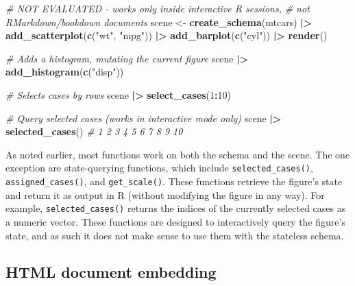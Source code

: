 \documentclass[
]{book}
\newenvironment{Shaded}{\begin{snugshade}}{\end{snugshade}}
\newcommand{\CommentTok}[1]{\textcolor[rgb]{0.56,0.35,0.01}{\textit{#1}}}
\newcommand{\DecValTok}[1]{\textcolor[rgb]{0.00,0.00,0.81}{#1}}
\newcommand{\FunctionTok}[1]{\textcolor[rgb]{0.13,0.29,0.53}{\textbf{#1}}}
\newcommand{\NormalTok}[1]{#1}
\newcommand{\OtherTok}[1]{\textcolor[rgb]{0.56,0.35,0.01}{#1}}
\newcommand{\SpecialCharTok}[1]{\textcolor[rgb]{0.81,0.36,0.00}{\textbf{#1}}}
\newcommand{\StringTok}[1]{\textcolor[rgb]{0.31,0.60,0.02}{#1}}
\theoremstyle{definition}
\theoremstyle{definition}
\theoremstyle{definition}
\theoremstyle{definition}
\theoremstyle{remark}
\begin{document}
\begin{Shaded}
\begin{Highlighting}[]
\CommentTok{\# NOT EVALUATED {-} works only inside interactive R sessions,}
\CommentTok{\# not RMarkdown/bookdown documents}
\NormalTok{scene }\OtherTok{\textless{}{-}} \FunctionTok{create\_schema}\NormalTok{(mtcars) }\SpecialCharTok{|\textgreater{}}
  \FunctionTok{add\_scatterplot}\NormalTok{(}\FunctionTok{c}\NormalTok{(}\StringTok{"wt"}\NormalTok{, }\StringTok{"mpg"}\NormalTok{)) }\SpecialCharTok{|\textgreater{}}
  \FunctionTok{add\_barplot}\NormalTok{(}\FunctionTok{c}\NormalTok{(}\StringTok{"cyl"}\NormalTok{)) }\SpecialCharTok{|\textgreater{}}
  \FunctionTok{render}\NormalTok{()}

\CommentTok{\# Adds a histogram, mutating the current figure}
\NormalTok{scene }\SpecialCharTok{|\textgreater{}} \FunctionTok{add\_histogram}\NormalTok{(}\FunctionTok{c}\NormalTok{(}\StringTok{"disp"}\NormalTok{))}

\CommentTok{\# Selects cases by rows}
\NormalTok{scene }\SpecialCharTok{|\textgreater{}} \FunctionTok{select\_cases}\NormalTok{(}\DecValTok{1}\SpecialCharTok{:}\DecValTok{10}\NormalTok{)}

\CommentTok{\# Query selected cases (works in interactive mode only)}
\NormalTok{scene }\SpecialCharTok{|\textgreater{}} \FunctionTok{selected\_cases}\NormalTok{() }\CommentTok{\# 1 2 3 4 5 6 7 8 9 10}
\end{Highlighting}
\end{Shaded}

As noted earlier, most functions work on both the schema and the scene. The one exception are state-querying functions, which include \texttt{selected\_cases()}, \texttt{assigned\_cases()}, and \texttt{get\_scale()}. These functions retrieve the figure's state and return it as output in R (without modifying the figure in any way). For example, \texttt{selected\_cases()} returns the indices of the currently selected cases as a numeric vector. These functions are designed to interactively query the figure's state, and as such it does not make sense to use them with the stateless schema.

\subsection{HTML document embedding}\label{html-document-embedding}
\end{document}
